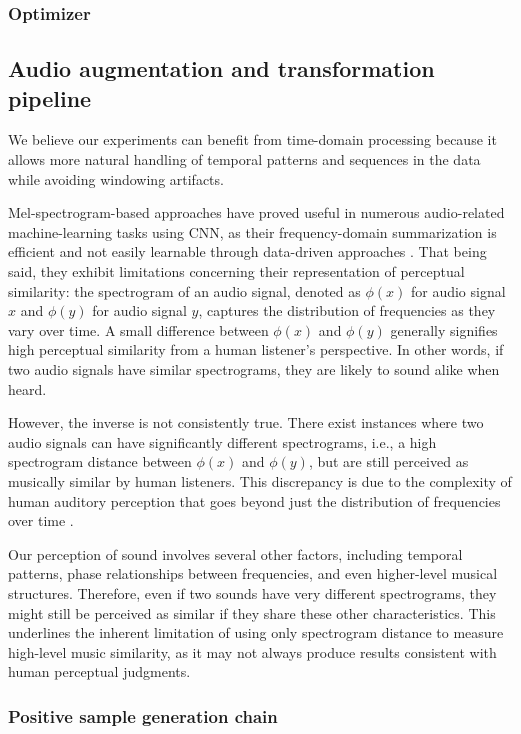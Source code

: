 \subsubsection{Optimizer}

\subsection{Audio augmentation and transformation pipeline}

We believe our experiments can benefit from time-domain processing because it allows more natural handling of temporal patterns and sequences in the data while avoiding windowing artifacts.

Mel-spectrogram-based approaches have proved useful in numerous audio-related machine-learning tasks using CNN, as their frequency-domain summarization is efficient and not easily learnable through data-driven approaches \cite{Kim2020OneStrategies}. That being said,  they exhibit limitations concerning their representation of perceptual similarity: the spectrogram of an audio signal, denoted as $\phi(x)$ for audio signal $x$ and $\phi(y)$ for audio signal $y$, captures the distribution of frequencies as they vary over time. A small difference between $\phi(x)$ and $\phi(y)$ generally signifies high perceptual similarity from a human listener's perspective. In other words, if two audio signals have similar spectrograms, they are likely to sound alike when heard.

However, the inverse is not consistently true. There exist instances where two audio signals can have significantly different spectrograms, i.e., a high spectrogram distance between $\phi(x)$ and $\phi(y)$, but are still perceived as musically similar by human listeners. This discrepancy is due to the complexity of human auditory perception that goes beyond just the distribution of frequencies over time \cite{Mesostructures2023}.

Our perception of sound involves several other factors, including temporal patterns, phase relationships between frequencies, and even higher-level musical structures. Therefore, even if two sounds have very different spectrograms, they might still be perceived as similar if they share these other characteristics. This underlines the inherent limitation of using only spectrogram distance to measure high-level music similarity, as it may not always produce results consistent with human perceptual judgments.

\subsubsection{Positive sample generation chain}

